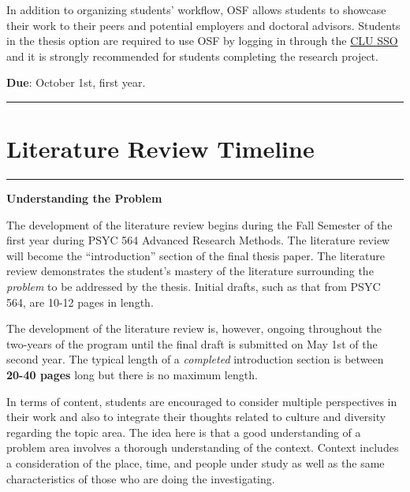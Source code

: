 \documentclass[openany]{book}
\begin{document}
In addition to organizing students' workflow, OSF allows students to showcase their work to their peers and potential employers and doctoral advisors. Students in the thesis option are required to use OSF by logging in through the \href{https://accounts.osf.io/login?campaign=institution\&service=https\%3A\%2F\%2Fosf.io\%2Flogin\%2F\%3Fnext\%3Dhttps\%253A\%252F\%252Fosf.io\%252F}{CLU SSO} and it is strongly recommended for students completing the research project.

\textbf{Due}: October 1st, first year.

\begin{center}\rule{0.5\linewidth}{0.5pt}\end{center}

\hypertarget{literature-review-timeline}{%
\section{Literature Review Timeline}\label{literature-review-timeline}}

\begin{center}\rule{0.5\linewidth}{0.5pt}\end{center}

\textbf{Understanding the Problem}

The development of the literature review begins during the Fall Semester of the first year during PSYC 564 Advanced Research Methods. The literature review will become the ``introduction'' section of the final thesis paper. The literature review demonstrates the student's mastery of the literature surrounding the \emph{problem} to be addressed by the thesis. Initial drafts, such as that from PSYC 564, are 10-12 pages in length.

The development of the literature review is, however, ongoing throughout the two-years of the program until the final draft is submitted on May 1st of the second year. The typical length of a \emph{completed} introduction section is between \textbf{20-40 pages} long but there is no maximum length.

In terms of content, students are encouraged to consider multiple perspectives in their work and also to integrate their thoughts related to culture and diversity regarding the topic area. The idea here is that a good understanding of a problem area involves a thorough understanding of the context. Context includes a consideration of the place, time, and people under study as well as the same characteristics of those who are doing the investigating.
\end{document}
